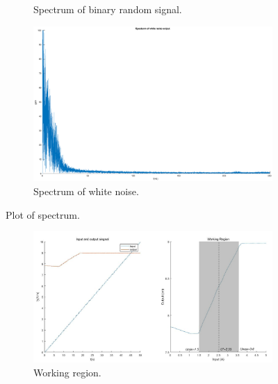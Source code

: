 \documentclass[10pt,a4paper]{article}
\begin{document}
\begin{itemize}
\begin{figure}[ht]
\begin{subfigure}[t]{.49\linewidth}
		\caption{Spectrum of binary random signal.}
		\label{fig:binarySpectrum}
		\end{subfigure}
		\begin{subfigure}[t]{.49\linewidth}
		\includegraphics[width=\columnwidth]{whiteNoiseSpectrum.eps} 
		\caption{Spectrum of white noise.}
		\label{fig:whiteNoiseSpectrum}
		\end{subfigure}
		\caption{Plot of spectrum.}
		\label{fig:spectrum}
	\end{figure}	
	\begin{figure}[ht]	
		\begin{subfigure}[t]{.49\linewidth}
		\footnotesize
		\centering 
		\includegraphics[width=\columnwidth]{findWorkingRegion.png} 
		\caption{Working region.}
		\label{fig:workingRegion}
		\end{subfigure}
		\begin{subfigure}[t]{.49\linewidth}

\end{subfigure}
\end{figure}
\end{itemize}
\end{document}
